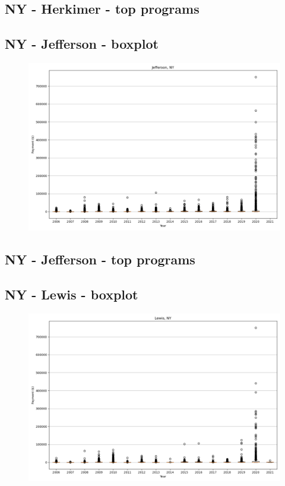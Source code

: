 \subsection*{NY - Herkimer - top programs}

\newpage
\subsection*{NY - Jefferson - boxplot}
\begin{figure}[h]
\centering
\includegraphics[width=7in]{../output/boxplots/counties/Jefferson-NY_boxplot.png}
\end{figure}


\subsection*{NY - Jefferson - top programs}

\newpage
\subsection*{NY - Lewis - boxplot}
\begin{figure}[h]
\centering
\includegraphics[width=7in]{../output/boxplots/counties/Lewis-NY_boxplot.png}
\end{figure}


